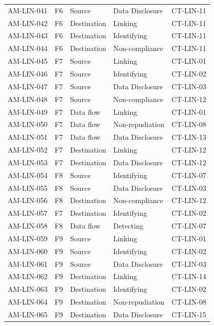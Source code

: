 \begin{footnotesize}
\begin{longtable}{l l p{} p{} l}
        AM-LIN-041 & F6 & Source & Data Disclosure & CT-LIN-11 \\
        AM-LIN-042 & F6 & Destination & Linking & CT-LIN-11 \\
        AM-LIN-043 & F6 & Destination & Identifying & CT-LIN-11 \\
        AM-LIN-044 & F6 & Destination & Non-compliance & CT-LIN-11 \\
        AM-LIN-045 & F7 & Source & Linking & CT-LIN-01 \\
        AM-LIN-046 & F7 & Source & Identifying & CT-LIN-02 \\
        AM-LIN-047 & F7 & Source & Data Disclosure & CT-LIN-03 \\
        AM-LIN-048 & F7 & Source & Non-compliance & CT-LIN-12 \\
        AM-LIN-049 & F7 & Data flow & Linking & CT-LIN-01 \\
        AM-LIN-050 & F7 & Data flow & Non-repudiation & CT-LIN-08 \\
        AM-LIN-051 & F7 & Data flow & Data Disclosure & CT-LIN-13 \\
        AM-LIN-052 & F7 & Destination & Linking & CT-LIN-12 \\
        AM-LIN-053 & F7 & Destination & Data Disclosure & CT-LIN-12 \\
        AM-LIN-054 & F8 & Source & Identifying & CT-LIN-07 \\
        AM-LIN-055 & F8 & Source & Data Disclosure & CT-LIN-03 \\
        AM-LIN-056 & F8 & Destination & Non-compliance & CT-LIN-12 \\
        AM-LIN-057 & F7 & Destination & Identifying & CT-LIN-02 \\
        AM-LIN-058 & F8 & Data flow & Detecting & CT-LIN-07 \\
        AM-LIN-059 & F9 & Source & Linking & CT-LIN-01 \\
        AM-LIN-060 & F9 & Source & Identifying & CT-LIN-02 \\
        AM-LIN-061 & F9 & Source & Data Disclosure & CT-LIN-03 \\
        AM-LIN-062 & F9 & Destination & Linking & CT-LIN-14 \\
        AM-LIN-063 & F9 & Destination & Identifying & CT-LIN-02 \\
        AM-LIN-064 & F9 & Destination & Non-repudiation & CT-LIN-08 \\
        AM-LIN-065 & F9 & Destination & Data Disclosure & CT-LIN-15 \\

\end{longtable}
\end{footnotesize}
